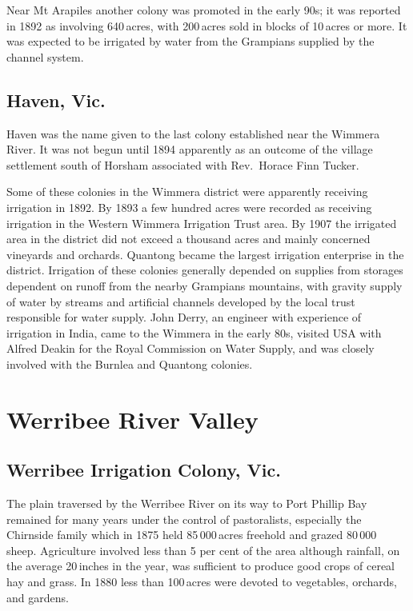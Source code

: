 Near Mt Arapiles another colony was promoted in the early 90s; it was
reported in 1892 as involving 640\,acres, with 200\,acres sold in blocks of
10\,acres or more.  It was expected to be irrigated by water from the
Grampians supplied by the channel system.

\subsection*{Haven, Vic.}

Haven was the name given to the last colony established near the
Wimmera River.  It was not begun until 1894 apparently as an outcome
of the village settlement south of Horsham associated with Rev.~Horace
Finn Tucker.

Some of these colonies in the Wimmera district were apparently
receiving irrigation in 1892.  By 1893 a few hundred acres were
recorded as receiving irrigation in the Western Wimmera Irrigation
Trust area. By 1907 the irrigated area in the district did not exceed
a thousand acres and mainly concerned vineyards and orchards. Quantong
became the largest irrigation enterprise in the district.  Irrigation
of these colonies generally depended on supplies from storages
dependent on runoff from the nearby Grampians mountains, with gravity
supply of water by streams and artificial channels developed by the
local trust responsible for water supply. John Derry, an engineer with
experience of irrigation in India, came to the Wimmera in the early
80s, visited USA with Alfred Deakin for the Royal Commission on Water
Supply, and was closely involved with the Burnlea and Quantong
colonies.

\section*{Werribee River Valley}

\subsection*{Werribee Irrigation Colony, Vic.}

The plain traversed by the Werribee River on its way to Port Phillip
Bay remained for many years under the control of pastoralists,
especially the Chirnside family which in 1875 held 85\,000\,acres
freehold and grazed 80\,000 sheep.  Agriculture involved less than 5
per cent of the area although rainfall, on the average 20\,inches in
the year, was sufficient to produce good crops of cereal hay and
grass.  In 1880 less than 100\,acres were devoted to vegetables,
orchards, and gardens.

